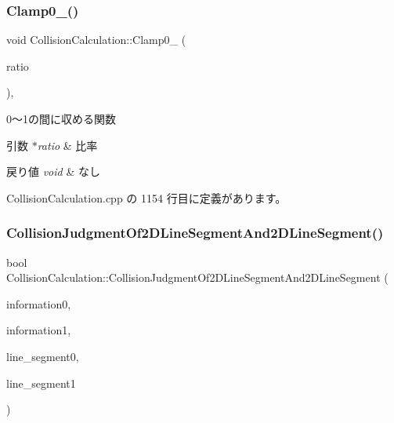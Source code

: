 \subsubsection{\texorpdfstring{Clamp0\+\_()}{Clamp0\_1()}}
{\footnotesize\ttfamily void Collision\+Calculation\+::\+Clamp0\+\_ (\begin{DoxyParamCaption}\item[{float $\ast$}]{ratio }\end{DoxyParamCaption})\hspace{0.3cm}{\ttfamily [static]}, {\ttfamily [private]}}



0〜1の間に収める関数 


\begin{DoxyParams}{引数}
{\em $\ast$ratio} & 比率 \\
\hline
\end{DoxyParams}

\begin{DoxyRetVals}{戻り値}
{\em void} & なし \\
\hline
\end{DoxyRetVals}


 Collision\+Calculation.\+cpp の 1154 行目に定義があります。

\mbox{\label{class_collision_calculation_af511e5bfb51712f6f4cc962b3b219dd1}} 
\subsubsection{\texorpdfstring{Collision\+Judgment\+Of2\+D\+Line\+Segment\+And2\+D\+Line\+Segment()}{CollisionJudgmentOf2DLineSegmentAnd2DLineSegment()}}
{\footnotesize\ttfamily bool Collision\+Calculation\+::\+Collision\+Judgment\+Of2\+D\+Line\+Segment\+And2\+D\+Line\+Segment (\begin{DoxyParamCaption}\item[{\mbox{\hyperlink{class_collision_information}{Collision\+Information}} $\ast$}]{information0,  }\item[{\mbox{\hyperlink{class_collision_information}{Collision\+Information}} $\ast$}]{information1,  }\item[{\mbox{\hyperlink{class_line_segment}{Line\+Segment}} $\ast$}]{line\+\_\+segment0,  }\item[{\mbox{\hyperlink{class_line_segment}{Line\+Segment}} $\ast$}]{line\+\_\+segment1 }\end{DoxyParamCaption})\hspace{0.3cm}{\ttfamily [static]}}



